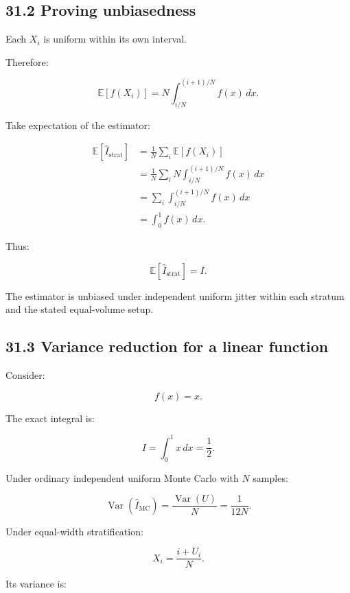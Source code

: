 \subsection{31.2 Proving unbiasedness}\label{02-foundations-ii-ch031-proving-unbiasedness}

\hypertarget{02-foundations-ii-ch031-proving-unbiasedness}{}

Each \(X_i\) is uniform within its own interval.

Therefore:

\[ \mathbb E[f(X_i)] = N\int_{i/N}^{(i+1)/N}f(x)\,dx. \]

Take expectation of the estimator:

\[ \begin{aligned} \mathbb E[\widehat I_{\mathrm{strat}}] &= \frac1N\sum_i\mathbb E[f(X_i)]\\ &= \frac1N\sum_i N\int_{i/N}^{(i+1)/N}f(x)\,dx\\ &= \sum_i\int_{i/N}^{(i+1)/N}f(x)\,dx\\ &= \int_0^1f(x)\,dx. \end{aligned} \]

Thus:

\[ \boxed{ \mathbb E[\widehat I_{\mathrm{strat}}]=I }. \]

The estimator is unbiased under independent uniform jitter within each stratum and the stated equal-volume setup.

\subsection{31.3 Variance reduction for a linear function}\label{02-foundations-ii-ch031-variance-reduction-for-a-linear-function}

\hypertarget{02-foundations-ii-ch031-variance-reduction-for-a-linear-function}{}

Consider:

\[ f(x)=x. \]

The exact integral is:

\[ I=\int_0^1x\,dx=\frac12. \]

Under ordinary independent uniform Monte Carlo with \(N\) samples:

\[ \operatorname{Var}(\widehat I_{\mathrm{MC}}) = \frac{\operatorname{Var}(U)}N = \boxed{\frac1{12N}}. \]

Under equal-width stratification:

\[ X_i=\frac{i+U_i}{N}. \]

Its variance is:

